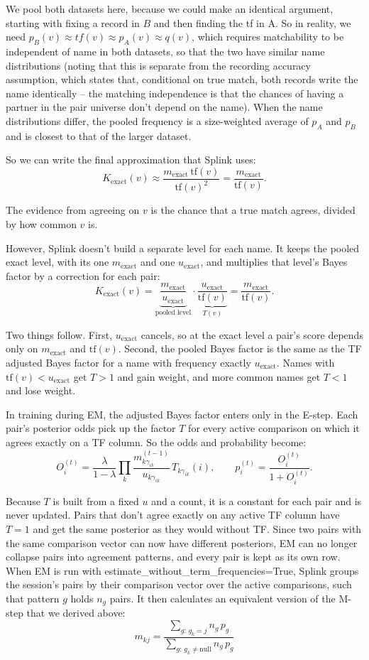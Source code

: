 \documentclass[11pt]{article}
\begin{document}
We pool both datasets here, because we could make an identical argument, starting with fixing a record in $B$ and then finding the tf in A. So in reality, we need $p_B(v) \approx tf(v) \approx p_A(v) \approx q(v)$, which requires matchability to be independent of name in both datasets, so that the two have similar name distributions (noting that this is separate from the recording accuracy assumption, which states that, conditional on true match, both records write the name identically -- the matching independence is that the chances of having a partner in the pair universe don't depend on the name). When the name distributions differ, the pooled frequency is a size-weighted average of $p_A$ and $p_B$ and is closest to that of the larger dataset.

So we can write the final approximation that Splink uses:
\[
K_{\text{exact}}(v) \approx \frac{m_{\text{exact}}\,\text{tf}(v)}{\text{tf}(v)^2} = \frac{m_{\text{exact}}}{\text{tf}(v)}.
\]

The evidence from agreeing on $v$ is the chance that a true match agrees, divided by how common $v$ is.

However, Splink doesn't build a separate level for each name. It keeps the pooled exact level, with its one $m_{\text{exact}}$ and one $u_{\text{exact}}$, and multiplies that level's Bayes factor by a correction for each pair:
\[
K_{\text{exact}}(v) = \underbrace{\frac{m_{\text{exact}}}{u_{\text{exact}}}}_{\text{pooled level}} \cdot \underbrace{\frac{u_{\text{exact}}}{\text{tf}(v)}}_{T(v)} = \frac{m_{\text{exact}}}{\text{tf}(v)}.
\]

Two things follow. First, $u_{\text{exact}}$ cancels, so at the exact level a pair's score depends only on $m_{\text{exact}}$ and $\text{tf}(v)$. Second, the pooled Bayes factor is the same as the TF adjusted Bayes factor for a name with frequency exactly $u_{\text{exact}}$. Names with $\text{tf}(v) < u_{\text{exact}}$ get $T > 1$ and gain weight, and more common names get $T < 1$ and lose weight.

In training during EM, the adjusted Bayes factor enters only in the E-step. Each pair's posterior odds pick up the factor $T$ for every active comparison on which it agrees exactly on a TF column. So the odds and probability become:
\[
O_i^{(t)} = \frac{\lambda}{1-\lambda}\prod_k \frac{m^{(t-1)}_{k\gamma_{ik}}}{u_{k\gamma_{ik}}}\,T_{k\gamma_{ik}}(i), \qquad p_i^{(t)} = \frac{O_i^{(t)}}{1+O_i^{(t)}}.
\]

Because $T$ is built from a fixed $u$ and a count, it is a constant for each pair and is never updated. Pairs that don't agree exactly on any active TF column have $T = 1$ and get the same posterior as they would without TF. Since two pairs with the same comparison vector can now have different posteriors, EM can no longer collapse pairs into agreement patterns, and every pair is kept as its own row. When EM is run with estimate\_without\_term\_frequencies=True, Splink groups the session's pairs by their comparison vector over the active comparisons, such that pattern $g$ holds $n_g$ pairs. It then calculates an equivalent version of the M-step that we derived above:
\[
m_{kj} = \frac{\sum_{g:\,g_k=j} n_g\,p_g}{\sum_{g:\,g_k\neq\text{null}} n_g\,p_g}
\]
\end{document}
